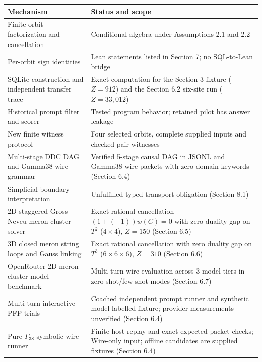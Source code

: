 \documentclass[
  11pt,
]{article}
\begin{document}
\begin{longtable}[]{@{}
  >{\raggedright\arraybackslash}p{}
  >{\raggedright\arraybackslash}p{}@{}}
\toprule\noalign{}
\begin{minipage}[b]{\linewidth}\raggedright
Mechanism
\end{minipage} & \begin{minipage}[b]{\linewidth}\raggedright
Status and scope
\end{minipage} \\
\midrule\noalign{}
\endhead
\bottomrule\noalign{}
\endlastfoot
Finite orbit factorization and cancellation & Conditional algebra under
Assumptions 2.1 and 2.2 \\
Per-orbit sign identities & Lean statements listed in Section 7; no
SQL-to-Lean bridge \\
SQLite construction and independent transfer trace & Exact computation
for the Section 3 fixture (\(Z = 912\)) and the Section 6.2 six-site run
(\(Z = 33{,}012\)) \\
Historical prompt filter and scorer & Tested program behavior; retained
pilot has answer leakage \\
New finite witness protocol & Four selected orbits, complete supplied
inputs and checked pair witnesses \\
Multi-stage DDC DAG and Gamma38 wire grammar & Verified 5-stage causal
DAG in JSONL and Gamma38 wire packets with zero domain keywords (Section
6.4) \\
Simplicial boundary interpretation & Unfulfilled typed transport
obligation (Section 8.1) \\
2D staggered Gross-Neveu meron cluster solver & Exact rational
cancellation \((1 + (-1)) w(C) = 0\) with zero duality gap on \(T^2\)
(\(4 \times 4\)), \(Z = 150\) (Section 6.5) \\
3D closed meron string loops and Gauss linking & Exact rational
cancellation with zero duality gap on \(T^3\) (\(6 \times 6 \times 6\)),
\(Z = 310\) (Section 6.6) \\
OpenRouter 2D meron cluster model benchmark & Multi-turn wire evaluation
across 3 model tiers in zero-shot/few-shot modes (Section 6.7) \\
Multi-turn interactive PFP trials & Coached independent prompt runner
and synthetic model-labelled fixture; provider measurements unverified
(Section 6.4) \\
Pure \(\Gamma_{38}\) symbolic wire runner & Finite host replay and exact
expected-packet checks; Wire-only input; offline candidates are supplied
fixtures (Section 6.4) \\
\end{longtable}
\end{document}

